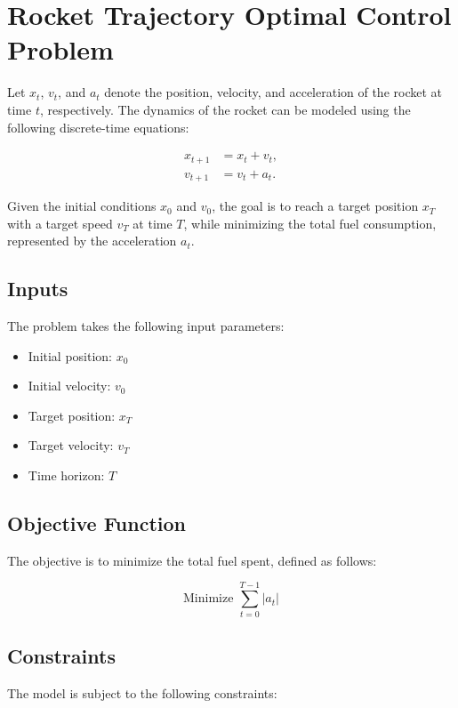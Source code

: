 \documentclass{article}
\begin{document}
\section*{Rocket Trajectory Optimal Control Problem}

Let \( x_t \), \( v_t \), and \( a_t \) denote the position, velocity, and acceleration of the rocket at time \( t \), respectively. The dynamics of the rocket can be modeled using the following discrete-time equations:

\begin{align}
    x_{t+1} &= x_t + v_t, \\
    v_{t+1} &= v_t + a_t.
\end{align}

Given the initial conditions \( x_0 \) and \( v_0 \), the goal is to reach a target position \( x_T \) with a target speed \( v_T \) at time \( T \), while minimizing the total fuel consumption, represented by the acceleration \( a_t \).

\subsection*{Inputs}

The problem takes the following input parameters:

\begin{itemize}
    \item Initial position: \( x_0 \)
    \item Initial velocity: \( v_0 \)
    \item Target position: \( x_T \)
    \item Target velocity: \( v_T \)
    \item Time horizon: \( T \)
\end{itemize}

\subsection*{Objective Function}

The objective is to minimize the total fuel spent, defined as follows:

\[
\text{Minimize } \sum_{t=0}^{T-1} |a_t|
\]

\subsection*{Constraints}

The model is subject to the following constraints:
\end{document}
